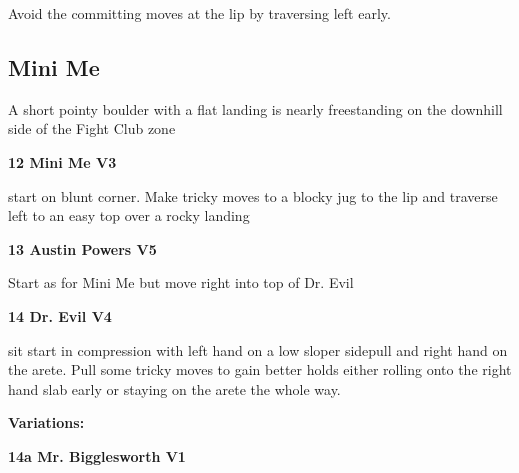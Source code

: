 \begin{multicols}{2}
\begin{adjustwidth}{0.5cm}{}
\begin{minipage}{\linewidth}
							\begin{adjustwidth}{0.5cm}{}				
							Avoid the committing moves at the lip by traversing left early.
							\end{adjustwidth}
							\end{minipage}
						\end{adjustwidth}
			\begin{minipage}{\columnwidth}
			\subsection*{Mini Me}\label{bf:Mini Me}
			A short pointy boulder with a flat landing is nearly freestanding on the downhill side of the Fight Club zone
			
			\end{minipage}
			
					\begin{minipage}{\linewidth}	
					\label{rt:Mini Me}
\colorbox{green!20}{
\parbox{0.95\textwidth}{
\textbf{
12 Mini Me V3  
}
}
}

					\begin{adjustwidth}{0.5cm}{}				
					start on blunt corner. Make tricky moves to a blocky jug to the lip and traverse left to an easy top over a rocky landing
					\end{adjustwidth}
					\end{minipage}
					\begin{minipage}{\linewidth}	
					\label{rt:Austin Powers}
\colorbox{RoyalBlue!20}{
\parbox{0.95\textwidth}{
\textbf{
13 Austin Powers V5    
}
}
}

					\begin{adjustwidth}{0.5cm}{}				
					Start as for Mini Me but move right into top of Dr. Evil
					\end{adjustwidth}
					\end{minipage}

					\begin{minipage}{\linewidth}	
					\label{rt:Dr. Evil}
\colorbox{RoyalBlue!20}{
\parbox{0.95\textwidth}{
\textbf{
14 Dr. Evil V4    
}
}
}

					\begin{adjustwidth}{0.5cm}{}				
					sit start in compression with left hand on a low sloper sidepull and right hand on the arete. Pull some tricky moves to gain better holds either rolling onto the right hand slab early or staying on the arete the whole way.
					\end{adjustwidth}
					\end{minipage}
						\begin{adjustwidth}{0.5cm}{}				
						\textbf{Variations:} \newline
							\begin{minipage}{\linewidth}	
							\label{vr:Mr. Bigglesworth}
\colorbox{green!20}{
\parbox{0.95\textwidth}{
\textbf{
14a Mr. Bigglesworth V1    
}
}
}


\end{minipage}
\end{adjustwidth}
\end{multicols}
